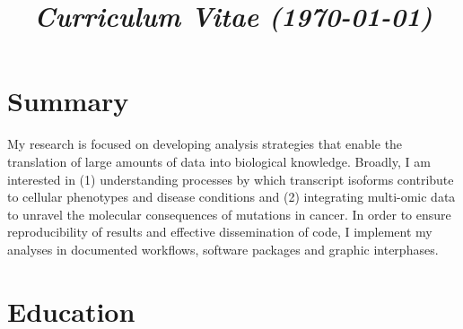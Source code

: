 \documentclass[11pt,a4paper,sans]{moderncv} %
\title{\emph{Curriculum Vitae (\today)}}
\begin{document}
\makecvtitle %
\vspace{-1.2cm}
\section{Summary}
My research is focused on developing analysis strategies that enable the translation of large amounts of data into biological knowledge. Broadly, I am interested in (1) understanding processes by which transcript isoforms contribute to cellular phenotypes and disease conditions and (2) integrating multi-omic data to unravel the molecular consequences of mutations in cancer. In order to ensure reproducibility of results and effective dissemination of code, I implement my analyses in documented  workflows, software packages and graphic interphases.

\section{Education}


\end{document}
